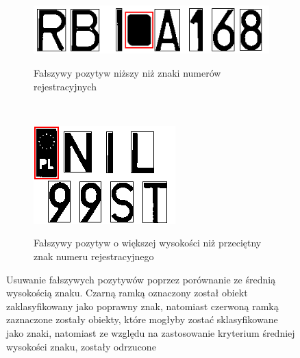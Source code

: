 \begin{figure}
  \centering
  \begin{subfigure}[b]{0.65\textwidth}
    \includegraphics[width=\textwidth]{img/standard-deviation-condition-too-small}
    \label{fig:standard_deviation_too_small}
    \caption{Fałszywy pozytyw niższy niż znaki numerów rejestracyjnych}
  \end{subfigure}
  ~
  \begin{subfigure}[b]{0.40\textwidth}
    \includegraphics[width=\textwidth]{img/standard-deviation-condition-too-big}
    \label{fig:standard_deviation_too_big}
    \caption{Fałszywy pozytyw o większej wysokości niż przeciętny znak numeru rejestracyjnego}
  \end{subfigure}
  \caption{Usuwanie fałszywych pozytywów poprzez porównanie ze średnią wysokością znaku. Czarną ramką oznaczony został obiekt zaklasyfikowany jako poprawny znak, natomiast czerwoną ramką zaznaczone zostały obiekty, które mogłyby zostać sklasyfikowane jako znaki, natomiast ze względu na zastosowanie kryterium średniej wysokości znaku, zostały odrzucone}
  \label{fig:standard_deviation_condition}
\end{figure}
